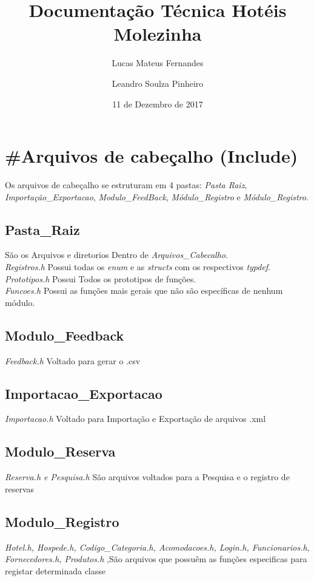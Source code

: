 \documentclass{article}
\title{Documentação Técnica Hotéis Molezinha}
\date{11 de Dezembro de 2017}
\author{Lucas Mateus Fernandes \and Leandro Soulza Pinheiro}
\begin{document}
  \maketitle
  \newpage
  \tableofcontents %
  \newpage


  \section{\#Arquivos de cabeçalho (Include)}
    Os arquivos de cabeçalho se estruturam em 4 pastas: \textit{ Pasta Raiz}, \textit{Importação\_Exportacao}, \textit{Modulo\_FeedBack}, \textit{Módulo\_Registro} e \textit{Módulo\_Registro}.
    \subsection{Pasta\_Raiz}
      São os Arquivos e diretorios Dentro de  \textit{Arquivos\_Cabecalho}.\\
      \textit{Registros.h} Possui todas os  \textit{enum} e as \textit{structs} com os respectivos \textit{typdef}.\\
      \textit{Prototipos.h} Possui Todos os prototipos de funções.\\ 
      \textit{Funcoes.h} Possui as funções mais gerais que não são específicas de nenhum módulo.\\
    \subsection{Modulo\_Feedback}
      \textit{Feedback.h} Voltado para gerar o .csv\\
    \subsection{Importacao\_Exportacao}
      \textit{Importacao.h} Voltado para Importação e Exportação de arquivos .xml\\
    \subsection{Modulo\_Reserva}
      \textit{Reserva.h e Pesquisa.h} São arquivos voltados para a Pesquisa e o registro de reservas\\
    \subsection{Modulo\_Registro}
      \textit{Hotel.h, Hospede.h, Codigo\_Categoria.h, Acomodacoes.h, Login.h, Funcionarios.h, Fornecedores.h, Produtos.h} ,São arquivos que possuêm as funções especificas para registar determinada classe\\
  \newpage
\end{document}
